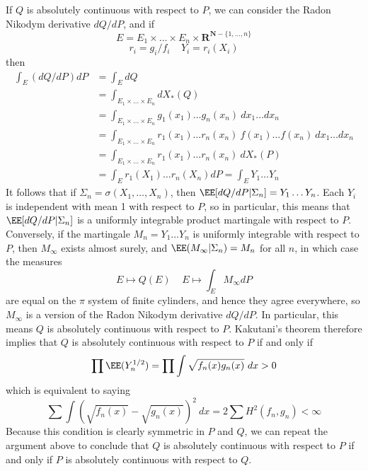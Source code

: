 \begin{example}
If $Q$ is absolutely continuous with respect to $P$, we can consider the Radon Nikodym derivative $dQ/dP$, and if
%
\[ E = E_1 \times \dots \times E_n \times \mathbf{R}^{\mathbf{N} - \{ 1, \dots, n \}} \]
\[ r_i = g_i/f_i\ \ \ \ \ Y_i = r_i(X_i) \]
%
then
%
\begin{align*}
    \int_E (dQ/dP) dP &= \int_E dQ\\
    &= \int_{E_1 \times \dots \times E_n} dX_*(Q)\\
    &= \int_{E_1 \times \dots \times E_n} g_1(x_1) \dots g_n(x_n)\ dx_1 \dots dx_n\\
    &= \int_{E_1 \times \dots \times E_n} r_1(x_1) \dots r_n(x_n)\ f(x_1) \dots f(x_n)\ dx_1 \dots dx_n\\
    &= \int_{E_1 \times \dots \times E_n} r_1(x_1) \dots r_n(x_n)\ dX_*(P)\\
    &= \int_{E} r_1(X_1) \dots r_n(X_n) dP = \int_E Y_1 \dots Y_n
\end{align*}
%
It follows that if $\Sigma_n = \sigma(X_1, \dots, X_n)$, then $\EE[dQ/dP|\Sigma_n] = Y_1 \dots Y_n$. Each $Y_i$ is independent with mean 1 with respect to $P$, so in particular, this means that $\EE[dQ/dP|\Sigma_n]$ is a uniformly integrable product martingale with respect to $P$. Conversely, if the martingale $M_n = Y_1 \dots Y_n$ is uniformly integrable with respect to $P$, then $M_\infty$ exists almost surely, and $\EE(M_\infty|\Sigma_n) = M_n$ for all $n$, in which case the measures
%
\[ E \mapsto Q(E)\ \ \ \ \ E \mapsto \int_E M_\infty dP \]
%
are equal on the $\pi$ system of finite cylinders, and hence they agree everywhere, so $M_\infty$ is a version of the Radon Nikodym derivative $dQ/dP$. In particular, this means $Q$ is absolutely continuous with respect to $P$. Kakutani's theorem therefore implies that $Q$ is absolutely continuous with respect to $P$ if and only if
%
\[ \prod \EE(Y_n^{1/2}) = \prod \int \sqrt{f_n(x) g_n(x)}\ dx > 0 \]
%
which is equivalent to saying
%
\[ \sum \int \left( \sqrt{f_n(x)} - \sqrt{g_n(x)} \right)^2\ dx = 2 \sum H^2(f_n,g_n) < \infty \]
%
Because this condition is clearly symmetric in $P$ and $Q$, we can repeat the argument above to conclude that $Q$ is absolutely continuous with respect to $P$ if and only if $P$ is absolutely continuous with respect to $Q$.


\end{example}
